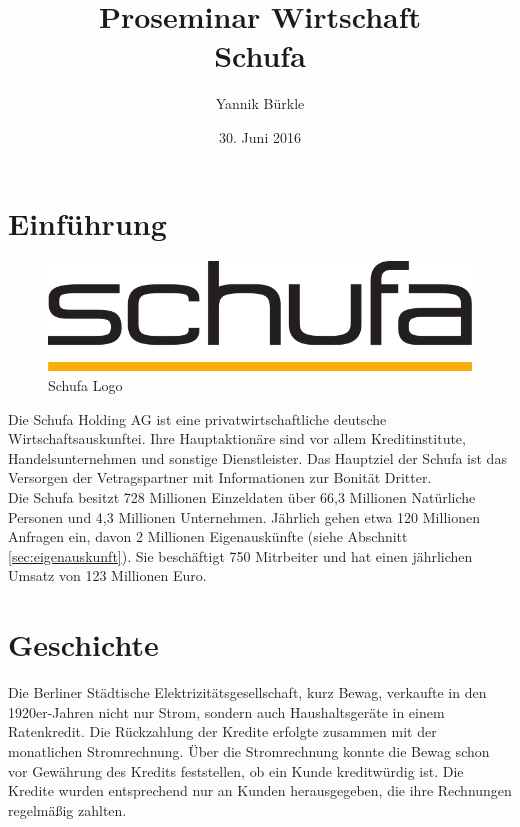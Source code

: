 \documentclass[12pt]{article}
\begin{document}
\begin{titlepage}
\title{Proseminar Wirtschaft\\Schufa}
\author{Yannik Bürkle}
\date{30. Juni 2016}
\end{titlepage}
\maketitle

\newpage

\tableofcontents

\newpage






\section{Einführung}
\begin{figure}[htbp]
    \centering
    \includegraphics[width=0.8\linewidth]{Schufa_Logo}
    \caption{Schufa Logo}
\end{figure}

Die Schufa Holding AG ist eine privatwirtschaftliche deutsche Wirtschaftsauskunftei. Ihre Hauptaktionäre 
sind vor allem Kreditinstitute, Handelsunternehmen und sonstige Dienstleister.
Das Hauptziel der Schufa ist das Versorgen der Vetragspartner mit Informationen zur Bonität Dritter.\\

Die Schufa besitzt 728 Millionen Einzeldaten über 66,3 Millionen Natürliche Personen und 4,3 Millionen Unternehmen. Jährlich gehen etwa 120 Millionen Anfragen ein, davon 2 Millionen Eigenauskünfte
(siehe Abschnitt \ref{sec:eigenauskunft}). Sie beschäftigt 750 Mitrbeiter und hat einen jährlichen Umsatz von 123 Millionen Euro.


\section{Geschichte}
Die Berliner Städtische Elektrizitätsgesellschaft, kurz Bewag, verkaufte in den 1920er-Jahren nicht nur Strom, sondern auch Haushaltsgeräte in einem Ratenkredit.
Die Rückzahlung der Kredite erfolgte zusammen mit der monatlichen Stromrechnung. Über die Stromrechnung konnte die Bewag schon vor Gewährung des Kredits feststellen, 
ob ein Kunde kreditwürdig ist. Die Kredite wurden entsprechend nur an Kunden herausgegeben, die ihre Rechnungen regelmäßig zahlten.
\end{document}
